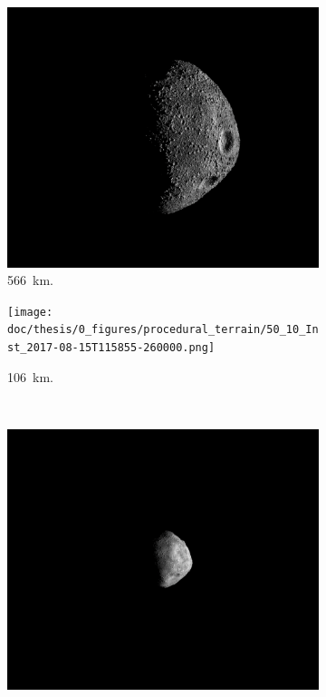 \begin{figure}[htb]
    \centering
    \begin{subfigure}[b]{0.48\textwidth}
        \centering
        \includegraphics[width=\textwidth]{doc/thesis/0_figures/procedural_terrain/50_10_Inst_2017-08-15T115755-845000.png}
        \caption{\SI{566}{\kilo\meter}.}
        \label{fig:render_quali_comparison_1}
    \end{subfigure}
    \begin{subfigure}[b]{0.48\textwidth}
        \centering
        \texttt{[image: doc/thesis/0\_figures/procedural\_terrain/50\_10\_Inst\_2017-08-15T115855-260000.png]}
        \caption{\SI{106}{\kilo\meter}.}
        \label{fig:render_quali_comparison_2}
    \end{subfigure}
    \\
    \begin{subfigure}[b]{0.48\textwidth}
        \centering
        \includegraphics[width=\textwidth]{doc/thesis/0_figures/procedural_terrain/50_1_Inst_2017-08-15T115837-133000.png}

\end{subfigure}
\end{figure}
